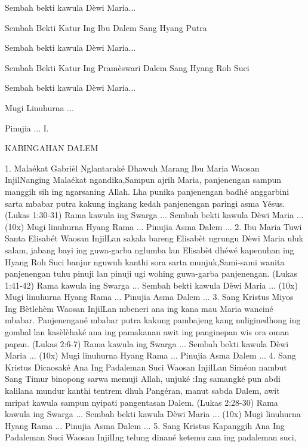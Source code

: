 \documentclass{scrbook}
\begin{document}
Sembah bekti kawula D\`ewi Maria...  

Sembah Bekti Katur
Ing Ibu Dalem Sang Hyang Putra 

Sembah bekti kawula D\`ewi Maria... 

Sembah Bekti Katur Ing Pram\`eswari Dalem Sang Hyang Roh Suci 

Sembah bekti kawula D\`ewi Maria...  

Mugi Linuhurna ...  

Pinujia ...  I.

KABINGAHAN DALEM 

1. Mala\'ekat Gabri\`el Nglantarak\'e Dhawuh Marang
Ibu Maria  Waosan InjilNanging Mala\'ekat
ngandika,{\textquotedbl}Sampun ajrih Maria, panjenengan sampun manggih
sih ing ngarsaning Allah. Lha punika panjenengan badh\'e anggarbini
sarta mbabar putra kakung ingkang kedah panjenengan paringi asma
Y\'esus.{\textquotedbl} (Lukas 1:30-31)  {\dag} Rama kawula ing Swarga
... {\dag} Sembah bekti kawula D\`ewi Maria ... (10x) {\dag} Mugi
linuhurna Hyang Rama ... {\dag} Pinujia Asma Dalem ...  2. Ibu Maria
Tuwi Santa Elisab\'et Waosan InjilLan sakala bareng Elisab\`et ngrungu
D\`ewi Maria uluk salam, jabang bayi ing guwa-garba nglumba lan
Elisab\`et dh\'ew\'e kapenuhan ing Hyang Roh Suci banjur nguwuh kanthi
sora sarta munjuk,{\textquotedbl}Sami-sami wanita panjenengan tuhu
pinuji lan pinuji ugi wohing guwa-garba panjenengan.{\textquotedbl}
(Lukas 1:41-42) {\dag} Rama kawula ing Swarga ... {\dag} Sembah bekti
kawula D\`ewi Maria ... (10x) {\dag} Mugi linuhurna Hyang Rama ...
{\dag} Pinujia Asma Dalem ...  3. Sang Kristus Miyos Ing B\`etleh\`em
Waosan InjilLan mbeneri ana ing kana mau Maria wancin\'e mbabar.
Panjenengan\'e mbabar putra kakung pambajeng kang nuliginedhong ing
gombal lan kas\`el\`ehak\'e ana ing pamakanan awit ing panginepan wis
ora oman papan. (Lukas 2:6-7) {\dag} Rama kawula ing Swarga ... {\dag}
Sembah bekti kawula D\`ewi Maria ... (10x) {\dag} Mugi linuhurna Hyang
Rama ... {\dag} Pinujia Asma Dalem ...  4. Sang Kristus Dicaosak\'e Ana
Ing Padaleman Suci Waosan InjilLan Sim\'eon nambut Sang Timur binopong
sarwa memuji Allah, unjuk\'e :{\textquotedbl}Ing samangk\'e pun abdi
kalilana mundur kanthi tentrem dhuh Pang\'eran, manut sabda Dalem, awit
mripat kawula sampun nyipati pangentasan Dalem.{\textquotedbl} (Lukas
2:28-30) {\dag} Rama kawula ing Swarga ... {\dag} Sembah bekti kawula
D\`ewi Maria ... (10x) {\dag} Mugi linuhurna Hyang Rama ... {\dag}
Pinujia Asma Dalem ...  5. Sang Kristus Kapanggih Ana Ing Padaleman
Suci Waosan InjilIng telung dinan\'e ketemu ana ing padaleman suci,
\end{document}
